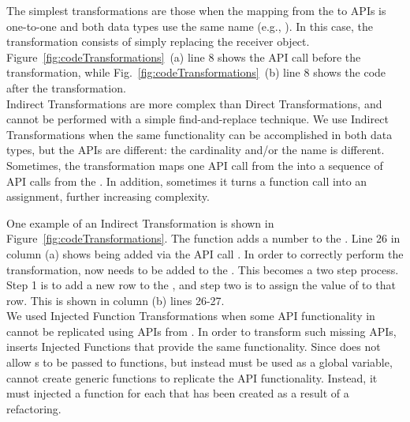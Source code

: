 \documentclass[preprint]{sigplanconf}
\begin{document}
 The simplest transformations are those when the mapping from the \NC{} to \CDT APIs is one-to-one and both data types use the same name (e.g., ). In this case, the transformation consists of simply replacing the receiver object. 
Figure~\ref{fig:codeTransformations}~(a) line 8 shows the API call before the transformation, while Fig.~\ref{fig:codeTransformations}~(b) line 
8 shows the code after the transformation.\\

Indirect Transformations are more complex than Direct Transformations, and cannot be performed with a simple find-and-replace technique. We use Indirect Transformations when the same functionality can be accomplished in both data types, but the APIs are different: the cardinality and/or the name is different. Sometimes, the transformation maps one API call from the \NC{} into a sequence of API calls from the \CDT{}. In addition, sometimes it turns a function call into an assignment, further increasing complexity.

One example of an Indirect Transformation is shown in Figure~\ref{fig:codeTransformations}. 
The function  adds a number to the  \NC{}. Line 26 in column (a) shows  being added via the API call .
In order to correctly perform the transformation,  now needs to be added to the  .
This becomes a two step process. Step 1 is to add a new row to the \CDT, and step two is to assign the value of  to that row. This is shown in column (b) lines 26-27. \\


We used Injected Function Transformations when some API functionality in \NC{} cannot be replicated using APIs from \CDT{}.
In order to transform such missing APIs, \tool inserts Injected Functions that provide the same functionality.  
Since \TD does not allow \CDT{}s to be passed to functions, but instead must be used as a global variable, \tool cannot create generic functions to replicate the API functionality.  
Instead, it must injected a function for each \CDT that has been created as a result of a refactoring. 
\end{document}
